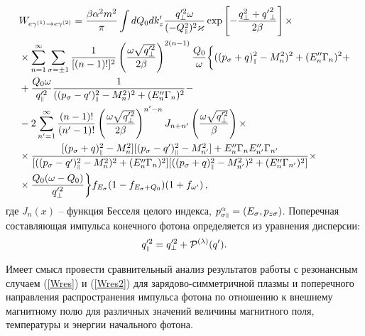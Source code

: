 \begin{equation}
	\begin{aligned}\label{Wres2}
		&W_{e\gamma^{(1)}\to e\gamma^{(2)}}=\frac{\beta\alpha^2m^2}{\pi} \int dQ_0dk'_z \frac{q_\perp'^2\omega } {(-Q_{\mbox{\tiny $\|$}}^2)^2\varkappa}\exp\left[-\frac{q_\perp^2+{q'}_\perp^2}{2\beta}\right]\times\\ 
		&\times\sum_{n=1}^{\infty}\sum_{\sigma=\pm 1}\frac{1}{[(n-1)!]^2}\left(\frac{\omega \sqrt{q_\perp'^2}}{2\beta}\right)^{2(n-1)}\frac{Q_0}{\omega}\bigg\{
		{((p_\sigma+q)_{\mbox{\tiny $\|$}}^2-M_n^2)^2+(E''_n\Gamma_n)^2}+
		\\
		&+\frac{Q_0 \omega}{ q'^2_{\mbox{\tiny $\|$}}}\frac{1}{((p_\sigma-q')_{\mbox{\tiny $\|$}}^2-M_n^2)^2+(E''_n\Gamma_n)^2}-
		\\
		&-2
		\sum_{n'=1}^{\infty}\frac{(n-1)!}{(n'-1)!}\left(\frac{\omega \sqrt{q_\perp'^2}}{2\beta}\right)^{n'-n} J_{n+n'}\left(\frac{\omega \sqrt{q_\perp'^2}}{\beta}\right)\times\\
		&\times\frac{[(p_\sigma+q)^2_{\mbox{\tiny $\|$}}-M_n^2][(p_\sigma-q')^2_{\mbox{\tiny $\|$}}-M^2_{n'}]+E''_n\Gamma_nE''_{n'}\Gamma_{n'}}{[((p_\sigma-q')_{\mbox{\tiny $\|$}}^2-M_n^2)^2+(E''_n\Gamma_n)^2][((p_\sigma+q)_{\mbox{\tiny $\|$}}^2-M_{n'}^2)^2+(E''_n\Gamma_{n'})^2]}
		\times\\&\times
		\frac{Q_0(\omega-Q_0)}{q'^2_\perp}
		\bigg\}f_{E_\sigma}(1-f_{E_\sigma+Q_0})(1+f_{\omega'}
		) \, ,
	\end{aligned}
\end{equation}
\noindent где $J_n(x)$ -- функция Бесселя целого индекса, $p^\alpha_{\sigma\mbox{\tiny $\|$}}=(E_\sigma,p_{z\sigma})$. Поперечная составляющая импульса конечного фотона определяется из уравнения дисперсии:
\begin{equation}
	q'^2_{\mbox{\tiny $\|$}}=q'^{2}_\perp + {\cal P}^{(\lambda)}(q') .
\end{equation}

Имеет смысл провести сравнительный анализ результатов работы \cite{Chistyakov:2009}  с резонансным случаем (\ref{Wres}) и (\ref{Wres2}) для зарядово-симметричной плазмы и поперечного направления распространения импульса фотона по отношению к внешнему магнитному полю для различных значений величины магнитного поля, температуры и энергии начального фотона.



